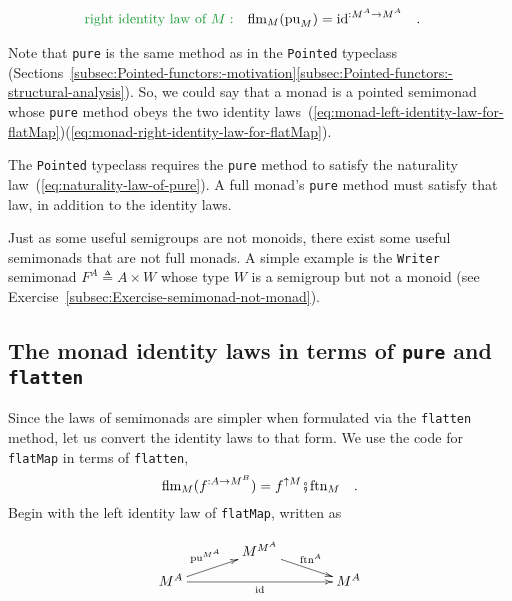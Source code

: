 ~\vspace{-1.4\baselineskip}
\begin{align}
{\color{greenunder}\text{right identity law of }M:}\quad & \text{flm}_{M}(\text{pu}_{M})=\text{id}^{:M^{A}\rightarrow M^{A}}\quad.\label{eq:monad-right-identity-law-for-flatMap}
\end{align}

Note that \lstinline!pure! is the same method as in the \lstinline!Pointed!
typeclass (Sections~\ref{subsec:Pointed-functors:-motivation}\textendash \ref{subsec:Pointed-functors:-structural-analysis}).
So, we could say that a monad is a pointed semimonad whose \lstinline!pure!
method obeys the two identity laws~(\ref{eq:monad-left-identity-law-for-flatMap})\textendash (\ref{eq:monad-right-identity-law-for-flatMap}).

The \lstinline!Pointed! typeclass requires the \lstinline!pure!
method to satisfy the naturality law~(\ref{eq:naturality-law-of-pure}).
A full monad\textsf{'}s \lstinline!pure! method must satisfy that law, in
addition to the identity laws.

Just as some useful semigroups are not monoids, there exist some useful
semimonads that are not full monads. A simple example is the \lstinline!Writer!
semimonad $F^{A}\triangleq A\times W$ whose type $W$ is a semigroup
but not a monoid (see Exercise~\ref{subsec:Exercise-semimonad-not-monad}).

\subsection{The monad identity laws in terms of \texttt{pure} and \texttt{flatten}}

Since the laws of semimonads are simpler when formulated via the \lstinline!flatten!
method, let us convert the identity laws to that form. We use the
code for \lstinline!flatMap! in terms of \lstinline!flatten!,
\[
\text{flm}_{M}(f^{:A\rightarrow M^{B}})=f^{\uparrow M}\bef\text{ftn}_{M}\quad.
\]
Begin with the left identity law of \lstinline!flatMap!, written
as

\begin{wrapfigure}{l}{0.32\columnwidth}%
\vspace{-1\baselineskip}

\[
\xymatrix{\xyScaleY{0.5pc}\xyScaleX{3pc} & M^{M^{A}}\ar[rd]\sp(0.5){\ \text{ftn}^{A}\ }\\
M^{A}\ar[ru]\sp(0.5){\text{pu}^{M^{A}}\ }\ar[rr]\sb(0.5){\text{id}} &  & M^{A}
}
\]
\vspace{-0.2\baselineskip}
\end{wrapfigure}%

